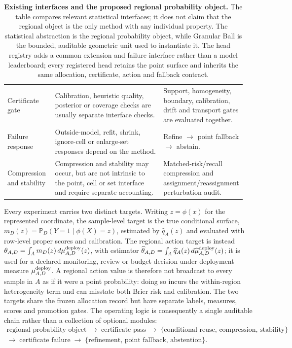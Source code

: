 \documentclass[10pt]{article}
\newcommand{\Prob}{\mathbb{P}}
\begin{document}
\begin{table}[H]
\begin{tabular}{@{}L{0.20\linewidth}L{0.47\linewidth}L{0.29\linewidth}@{}}
Certificate gate & Calibration, heuristic quality, posterior or coverage checks are usually separate interface checks. & Support, homogeneity, boundary, calibration, drift and transport gates are evaluated together. \\
Failure response & Outside-model, refit, shrink, ignore-cell or enlarge-set responses depend on the method. & Refine $\to$ point fallback $\to$ abstain. \\
Compression and stability & Compression and stability may occur, but are not intrinsic to the point, cell or set interface and require separate accounting. & Matched-risk/recall compression and assignment/reassignment perturbation audit. \\
\bottomrule
\end{tabular}
\caption{\textbf{Existing interfaces and the proposed regional probability object.} The table compares relevant statistical interfaces; it does not claim that the regional object is the only method with any individual property. The statistical abstraction is the regional probability object, while Granular Ball is the bounded, auditable geometric unit used to instantiate it. The head registry adds a common extension and failure interface rather than a model leaderboard; every registered head retains the point surface and inherits the same allocation, certificate, action and fallback contract.}
\label{tab:object-comparison}
\end{table}

Every experiment carries two distinct targets. Writing $z=\phi(x)$ for the represented coordinate, the sample-level target is the true conditional surface, $m_D(z)=\Prob_D(Y=1\mid \phi(X)=z)$, estimated by $\widehat q_A(z)$ and evaluated with row-level proper scores and calibration. The regional action target is instead $\theta_{A,D}=\int_A m_D(z)\,d\mu^{\rm deploy}_{A,D}(z)$, with estimator $\widehat\theta_{A,D}=\int_A\widehat q_A(z)\,d\widehat\mu^{\rm deploy}_{A,D}(z)$; it is used for a declared monitoring, review or budget decision under deployment measure $\mu^{\rm deploy}_{A,D}$. A regional action value is therefore not broadcast to every sample in $A$ as if it were a point probability: doing so incurs the within-region heterogeneity term and can misstate both Brier risk and calibration. The two targets share the frozen allocation record but have separate labels, measures, scores and promotion gates. The operating logic is consequently a single auditable chain rather than a collection of optional modules:
\[
\begin{gathered}
\text{regional probability object}\;\longrightarrow\;\text{certificate pass}\;\longrightarrow\;
\{\text{conditional reuse, compression, stability}\}\\
\longrightarrow\;\text{certificate failure}\;\longrightarrow\;
\{\text{refinement, point fallback, abstention}\}.
\end{gathered}
\]
\end{document}
